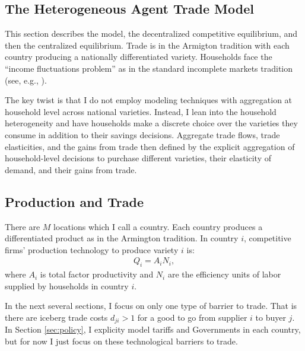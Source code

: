 \documentclass[12pt,pdftex]{article}
\begin{document}
\begin{onehalfspacing}
\hspace{-0.05cm}



\thispagestyle{empty}
\newpage
\normalsize

\section{The Heterogeneous Agent Trade Model}

This section describes the model, the decentralized competitive equilibrium, and then the centralized equilibrium. Trade is in the Armigton tradition with each country producing a nationally differentiated variety. Households face the ``income fluctuations problem'' as in the standard incomplete markets tradition (see, e.g., \citet{ljungqvist2012recursive}).

The key twist is that I do not employ modeling techniques with aggregation at household level across national varieties. Instead, I lean into the household heterogeneity and have households make a discrete choice over the varieties they consume in addition to their savings decisions. Aggregate trade flows, trade elasticities, and the gains from trade then defined by the explicit aggregation of household-level decisions to purchase different varieties, their elasticity of demand, and their gains from trade.

\subsection{Production and Trade}\label{sec:trade}

There are $M$ locations which I call a country. Each country produces a differentiated product as in the Armington tradition. In country $i$, competitive firms' production technology to produce variety $i$ is:
\begin{align}
Q_i = A_i N_i,
\label{eq:production}
\end{align}
where $A_i$ is total factor productivity and $N_i$ are the efficiency units of labor supplied by households in country $i$.

In the next several sections, I focus on only one type of barrier to trade. That is there are iceberg trade costs $d_{ji} > 1$ for a good to go from supplier $i$ to buyer $j$. In Section \ref{sec:policy}, I explicity model  tariffs and Governments in each country, but for now I just focus on these technological barriers to trade.


\end{onehalfspacing}
\end{document}
